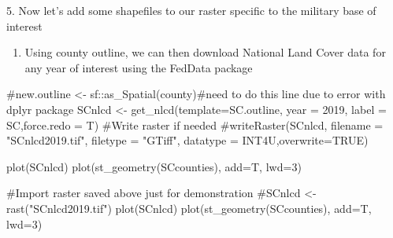\documentclass[
  letterpaper,
]{book}
\newenvironment{Shaded}{\begin{snugshade}}{\end{snugshade}}
\newcommand{\AttributeTok}[1]{\textcolor[rgb]{0.40,0.45,0.13}{#1}}
\newcommand{\CommentTok}[1]{\textcolor[rgb]{0.37,0.37,0.37}{#1}}
\newcommand{\DecValTok}[1]{\textcolor[rgb]{0.68,0.00,0.00}{#1}}
\newcommand{\FunctionTok}[1]{\textcolor[rgb]{0.28,0.35,0.67}{#1}}
\newcommand{\NormalTok}[1]{\textcolor[rgb]{0.00,0.23,0.31}{#1}}
\newcommand{\OtherTok}[1]{\textcolor[rgb]{0.00,0.23,0.31}{#1}}
\newcommand{\SpecialCharTok}[1]{\textcolor[rgb]{0.37,0.37,0.37}{#1}}
\newcommand{\StringTok}[1]{\textcolor[rgb]{0.13,0.47,0.30}{#1}}
\providecommand{\tightlist}{%
  \setlength{\itemsep}{0pt}\setlength{\parskip}{0pt}}\usepackage{longtable,booktabs,array}
\begin{document}
5. Now let's add some shapefiles to our raster specific to the military
base of interest

\begin{Shaded}
\end{Shaded}

\begin{enumerate}
\def\labelenumi{\arabic{enumi}.}
\setcounter{enumi}{5}
\tightlist
\item
  Using county outline, we can then download National Land Cover data
  for any year of interest using the FedData package
\end{enumerate}

\begin{Shaded}
\begin{Highlighting}[]
\CommentTok{\#new.outline \textless{}{-} sf::as\_Spatial(county)\#need to do this line due to error with dplyr package}
\NormalTok{SCnlcd }\OtherTok{\textless{}{-}} \FunctionTok{get\_nlcd}\NormalTok{(}\AttributeTok{template=}\NormalTok{SC.outline, }\AttributeTok{year =} \DecValTok{2019}\NormalTok{, }\AttributeTok{label =} \StringTok{\textquotesingle{}SC\textquotesingle{}}\NormalTok{,}\AttributeTok{force.redo =}\NormalTok{ T)}
\CommentTok{\#Write raster if needed}
\CommentTok{\#writeRaster(SCnlcd, filename = "SCnlcd2019.tif", filetype = "GTiff", datatype = \textquotesingle{}INT4U\textquotesingle{},overwrite=TRUE)}
  
\FunctionTok{plot}\NormalTok{(SCnlcd)}
\FunctionTok{plot}\NormalTok{(}\FunctionTok{st\_geometry}\NormalTok{(SCcounties), }\AttributeTok{add=}\NormalTok{T, }\AttributeTok{lwd=}\DecValTok{3}\NormalTok{)}

\CommentTok{\#Import raster saved above just for demonstration}
\CommentTok{\#SCnlcd \textless{}{-}rast("SCnlcd2019.tif")}
\FunctionTok{plot}\NormalTok{(SCnlcd)}
\FunctionTok{plot}\NormalTok{(}\FunctionTok{st\_geometry}\NormalTok{(SCcounties), }\AttributeTok{add=}\NormalTok{T, }\AttributeTok{lwd=}\DecValTok{3}\NormalTok{)}
\end{Highlighting}
\end{Shaded}
\end{document}
